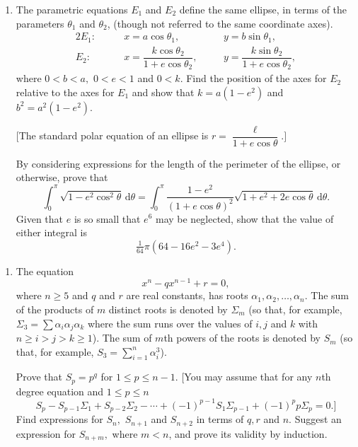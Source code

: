 \documentclass[a4, 11pt]{report}
\newlength{\qspace}
\newcounter{qnumber}
\newenvironment{question}%
 {\vspace{\qspace}
  \begin{enumerate}[\bfseries 1\quad][10]%
    \setcounter{enumi}{\value{qnumber}}%
    \item%
 }
{
  \end{enumerate}
  \filbreak
  \stepcounter{qnumber}
 }
\begin{document}
		
		\begin{question}
The parametric equations $E_{1}$ and $E_{2}$ define the same
ellipse, in terms of the parameters $\theta_{1}$ and $\theta_{2}$,
(though not referred to the same coordinate axes). 
\begin{alignat*}{2}
E_{1}:\qquad & x=a\cos\theta_{1}, & \quad & y=b\sin\theta_{1},\\
E_{2}:\qquad & x=\dfrac{k\cos\theta_{2}}{1+e\cos\theta_{2}}, & \quad & y=\dfrac{k\sin\theta_{2}}{1+e\cos\theta_{2}},
\end{alignat*}
where $0<b<a,$ $0<e<1$ and $0<k$. Find the position of the axes
for $E_{2}$ relative to the axes for $E_{1}$ and show that $k=a(1-e^{2})$
and $b^{2}=a^{2}(1-e^{2}).$


{[}The standard polar equation of an ellipse is $r=\dfrac{\ell}{1+e\cos\theta}.]$


By considering expressions for the length of the perimeter of the
ellipse, or otherwise, prove that 
\[
\int_{0}^{\pi}\sqrt{1-e^{2}\cos^{2}\theta}\,\mathrm{d}\theta=\int_{0}^{\pi}\frac{1-e^{2}}{(1+e\cos\theta)^{2}}\sqrt{1+e^{2}+2e\cos\theta}\,\mathrm{d}\theta.
\]
Given that $e$ is so small that $e^{6}$ may be neglected, show that
the value of either integral is 
\[
\tfrac{1}{64}\pi(64-16e^{2}-3e^{4}).
\]
		\end{question}
		
	
\begin{question}
The equation 
\[
x^{n}-qx^{n-1}+r=0,
\]
 where $n\geqslant5$ and $q$ and $r$ are real constants, has roots
$\alpha_{1},\alpha_{2},\ldots,\alpha_{n}.$ The sum of the products
of $m$ distinct roots is denoted by $\Sigma_{m}$ (so that, for example,
$\Sigma_{3}=\sum\alpha_{i}\alpha_{j}\alpha_{k}$ where the sum runs
over the values of $i,j$ and $k$ with $n\geqslant i>j>k\geqslant1$).
The sum of $m$th powers of the roots is denoted by $S_{m}$ (so that,
for example, $S_{3}=\sum\limits_{i=1}^{n}\alpha_{i}^{3}$). 


Prove that $S_{p}=p^{q}$ for $1\leqslant p\leqslant n-1.$ {[}You
may assume that for any $n$th degree equation and $1\leqslant p\leqslant n$
\[
S_{p}-S_{p-1}\Sigma_{1}+S_{p-2}\Sigma_{2}-\cdots+(-1)^{p-1}S_{1}\Sigma_{p-1}+(-1)^{p}p\Sigma_{p}=0.]
\]
Find expressions for $S_{n},$ $S_{n+1}$ and $S_{n+2}$ in terms
of $q,r$ and $n$. Suggest an expression for $S_{n+m},$ where $m<n$,
and prove its validity by induction. 
\end{question}
			
		
		
\end{document}
